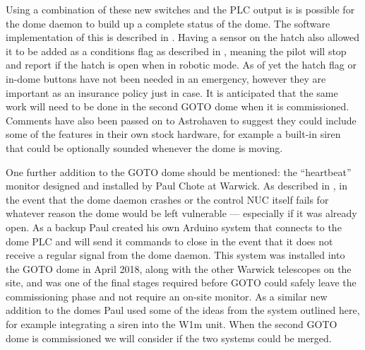\begin{colsection}
\begin{colsection}
\clearpage

Using a combination of these new switches and the PLC output is is possible for the dome daemon to build up a complete status of the dome. The software implementation of this is described in . Having a sensor on the hatch also allowed it to be added as a conditions flag as described in , meaning the pilot will stop and report if the hatch is open when in robotic mode. As of yet the hatch flag or in-dome buttons have not been needed in an emergency, however they are important as an insurance policy just in case. It is anticipated that the same work will need to be done in the second GOTO dome when it is commissioned. Comments have also been passed on to Astrohaven to suggest they could include some of the features in their own stock hardware, for example a built-in siren that could be optionally sounded whenever the dome is moving.

One further addition to the GOTO dome should be mentioned: the ``heartbeat'' monitor designed and installed by Paul Chote at Warwick. As described in , in the event that the dome daemon crashes or the control NUC itself fails for whatever reason the dome would be left vulnerable --- especially if it was already open. As a backup Paul created his own Arduino system that connects to the dome PLC and will send it commands to close in the event that it does not receive a regular signal from the dome daemon. This system was installed into the GOTO dome in April 2018, along with the other Warwick telescopes on the site, and was one of the final stages required before GOTO could safely leave the commissioning phase and not require an on-site monitor. As a similar new addition to the domes Paul used some of the ideas from the system outlined here, for example integrating a siren into the W1m unit. When the second GOTO dome is commissioned we will consider if the two systems could be merged.

\end{colsection}


\end{colsection}


\newpage
